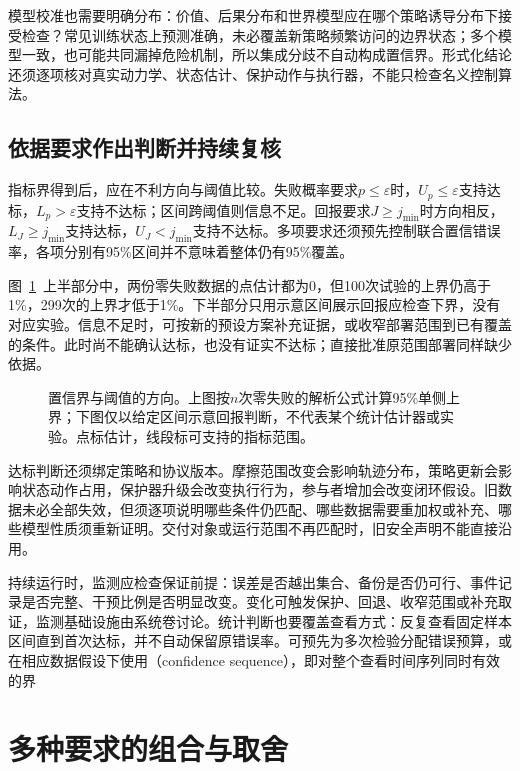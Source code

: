模型校准也需要明确分布：价值、后果分布和世界模型应在哪个策略诱导分布下接受检查？常见训练状态上预测准确，未必覆盖新策略频繁访问的边界状态；多个模型一致，也可能共同漏掉危险机制，所以集成分歧不自动构成置信界。形式化结论还须逐项核对真实动力学、状态估计、保护动作与执行器，不能只检查名义控制算法。

\subsection{依据要求作出判断并持续复核}
\label{sec:rl-trustworthy-decision}

指标界得到后，应在不利方向与阈值比较。失败概率要求$p\leq\varepsilon$时，$U_p\leq\varepsilon$支持达标，$L_p>\varepsilon$支持不达标；区间跨阈值则信息不足。回报要求$J\geq j_{\min}$时方向相反，$L_J\geq j_{\min}$支持达标，$U_J<j_{\min}$支持不达标。多项要求还须预先控制联合置信错误率，各项分别有95\%区间并不意味着整体仍有95\%覆盖。

图~\ref{fig:rl-trustworthy-intervals}~上半部分中，两份零失败数据的点估计都为0，但100次试验的上界仍高于1\%，299次的上界才低于1\%。下半部分只用示意区间展示回报应检查下界，没有对应实验。信息不足时，可按新的预设方案补充证据，或收窄部署范围到已有覆盖的条件。此时尚不能确认达标，也没有证实不达标；直接批准原范围部署同样缺少依据。

\begin{figure}[t]
  \centering
  
  \caption{置信界与阈值的方向。上图按$n$次零失败的解析公式计算95\%单侧上界；下图仅以给定区间示意回报判断，不代表某个统计估计器或实验。点标估计，线段标可支持的指标范围。}
  \label{fig:rl-trustworthy-intervals}
\end{figure}

达标判断还须绑定策略和协议版本。摩擦范围改变会影响轨迹分布，策略更新会影响状态动作占用，保护器升级会改变执行行为，参与者增加会改变闭环假设。旧数据未必全部失效，但须逐项说明哪些条件仍匹配、哪些数据需要重加权或补充、哪些模型性质须重新证明。交付对象或运行范围不再匹配时，旧安全声明不能直接沿用。

持续运行时，监测应检查保证前提：误差是否越出集合、备份是否仍可行、事件记录是否完整、干预比例是否明显改变。变化可触发保护、回退、收窄范围或补充取证，监测基础设施由系统卷讨论。统计判断也要覆盖查看方式：反复查看固定样本区间直到首次达标，并不自动保留原错误率。可预先为多次检验分配错误预算，或在相应数据假设下使用（confidence sequence），即对整个查看时间序列同时有效的界

\section{多种要求的组合与取舍}
\label{sec:rl-trustworthy-combination}


